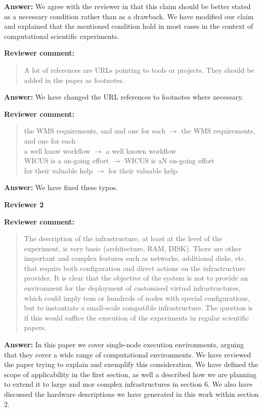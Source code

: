 \documentclass{letter}
\newenvironment{review}%
{\textbf{Reviewer comment:}\begin{quote}}%
{\end{quote}}%
\newcommand{\answer}[1]{%
      \textbf{Answer:} #1}
\begin{document}
\begin{letter}{}
\answer{We agree with the reviewer in that this claim should be better stated as a necessary condition rather than as a drawback. We have modified our claim and explained that the mentioned condition hold in most cases in the context of computational scientific experiments. }


\begin{review}
A lot of references are URLs pointing to tools or projects. They should be added in the paper as footnotes.
\end{review}

\answer{We have changed the URL references to footnotes where necessary.}


\begin{review}
the WMS requirements, and and one for each $\rightarrow$ the WMS requirements, and one for each \\
a well know workflow $\rightarrow$ a well known workflow \\
WICUS is a on-going effort $\rightarrow$ WICUS is aN on-going effort \\
for their valuable help $\rightarrow$ for their valuable help.
\end{review}

\answer{We have fixed these typos.}



\newpage

%
%
\textbf{Reviewer 2}


\begin{review}
The description of the infrastructure, at least at the level of the experiment, is very basic (architecture, RAM, DISK). There are other important and complex features such as networks, additional disks, etc. that require both configuration and direct actions on the infrastructure provider. It is clear that the objective of the system is not to provide an environment for the deployment of customised virtual infrastructures, which could imply tens or hundreds of nodes with special configurations, but to instantiate a small-scale compatible infrastructure. The question is if this would suffice the execution of the experiments in regular scientific papers.
\end{review}

\answer{In this paper we cover single-node execution environments, arguing that they cover a wide range of computational environments. We have reviewed the paper trying to explain and exemplify this consideration. We have defined the scope of applicability in the first section, as well a described how we are planning to extend it to large and mor complex infrastructures in section 6. We also have discussed the hardware descriptions we have generated in this work within section 2.}


\end{letter}
\end{document}
